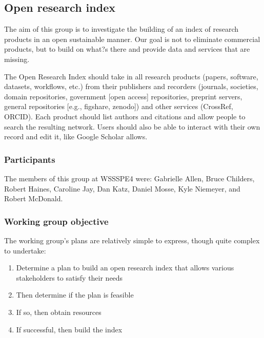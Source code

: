 \subsection{Open research index}
\label{sec:open-research-index}


The aim of this group is to investigate the building of an index of research products in an open sustainable manner.  Our goal is not to eliminate commercial products, but to build on what?s there and provide data and services that are missing.

The Open Research Index should take in all research products (papers, software, datasets, workflows, etc.) from their publishers and recorders (journals, societies, domain repositories, government [open access] repositories, preprint servers, general repositories [e.g., figshare, zenodo]) and other services (CrossRef, ORCID).
Each product should list authors and citations and allow people to search the resulting network.
Users should also be able to interact with their own record and edit it, like Google Scholar allows.

\subsubsection{Participants}

The members of this group at WSSSPE4 were:
Gabrielle Allen,
Bruce Childers,
Robert Haines,
Caroline Jay,
Dan Katz,
Daniel Mosse,
Kyle Niemeyer,
and
Robert McDonald.

\subsubsection{Working group objective}

The working group's plans are relatively simple to express, though quite complex to undertake:

\begin{enumerate}
\item Determine a plan to build an open research index that allows various stakeholders to satisfy their needs
\item Then determine if the plan is feasible
\item If so, then obtain resources
\item If successful, then build the index
\end{enumerate}

